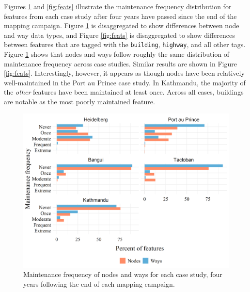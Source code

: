 Figures \ref{fig:types} and \ref{fig:feats} illustrate the maintenance frequency distribution for features from each case study after four years have passed since the end of the mapping campaign. Figure \ref{fig:types} is disaggregated to show differences between node and way data types, and Figure \ref{fig:feats} is disaggregated to show differences between features that are tagged with the \texttt{building}, \texttt{highway}, and all other tags. Figure \ref{fig:types} shows that nodes and ways follow roughly the same distribution of maintenance frequency across case studies. Similar results are shown in Figure \ref{fig:feats}. Interestingly, however, it appears as though nodes have been relatively well-maintained in the Port au Prince case study. In Kathmandu, the majority of the \textit{other} features have been maintained at least once. Across all cases, buildings are notable as the most poorly maintained feature. 

\begin{figure} %
    \centering %
    \includegraphics[width = \textwidth]{Images/typesmaint.png} %
    \caption{Maintenance frequency of nodes and ways for each case study, four years following the end of each mapping campaign.} %
    \label{fig:types} %
\end{figure}

